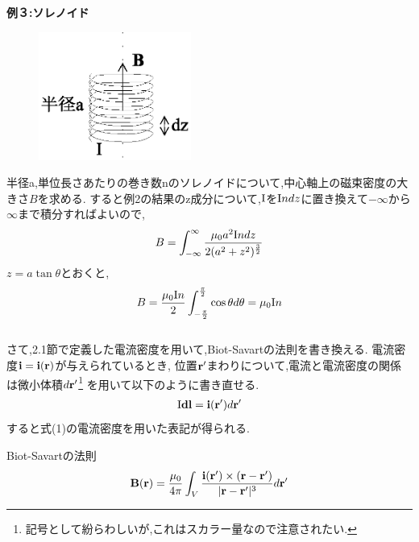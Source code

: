 \documentclass{jsarticle}
\begin{document}
\newpage
{\bf 例３:ソレノイド} \\
\begin{figure}[htbp]
 \begin{center}
  \includegraphics[width=50mm]{8.5.eps}
 \end{center}
 \caption{}
 \label{fig:five}
\end{figure}
半径a,単位長さあたりの巻き数nのソレノイドについて,中心軸上の磁束密度の大きさ$B$を求める.
すると例2の結果のz成分について,${\rm I}$を${\rm I}ndz$に置き換えて$-\infty$から$\infty$まで積分すればよいので,
\begin{eqnarray*}
B=\int_{-\infty}^{\infty} \frac{\mu_0 a^2  {\rm I}ndz  }{2 (a^2+z^2)^{\frac{3}{2}} }
\end{eqnarray*}
$z=a\tan\theta$とおくと,
\begin{eqnarray*}
B= \frac{\mu_0 {\rm I}n}{2} \int_{-\frac{\pi}{2}}^{\frac{\pi}{2}} \cos \theta d\theta = \mu_0 {\rm I}n
\end{eqnarray*}
\\
さて,2.1節で定義した電流密度を用いて,Biot-Savartの法則を書き換える.
電流密度${\bf i}={\bf i}({\bf r})$が与えられているとき,
位置${\bf r'}$まわりについて,電流と電流密度の関係は微小体積$d{\bf r'}$\footnote{記号として紛らわしいが,これはスカラー量なので注意されたい.}
を用いて以下のように書き直せる.
\begin{eqnarray*}
{\rm I}{\bf dl} = {\bf i}({\bf r'})d{\bf r'}
\end{eqnarray*}
すると式(1)の電流密度を用いた表記が得られる.
\begin{itembox}[c]{Biot-Savartの法則}
\begin{eqnarray}
{\bf B}({\bf r})=\frac{\mu_0}{4 \pi} \int_{V}^{}\frac{{\bf i}({\bf r'}) \times ({\bf r}-{\bf r'})}{|{\bf r}-{\bf r'}|^3} d{\bf r'}
\end{eqnarray}
\end{itembox}
\end{document}
